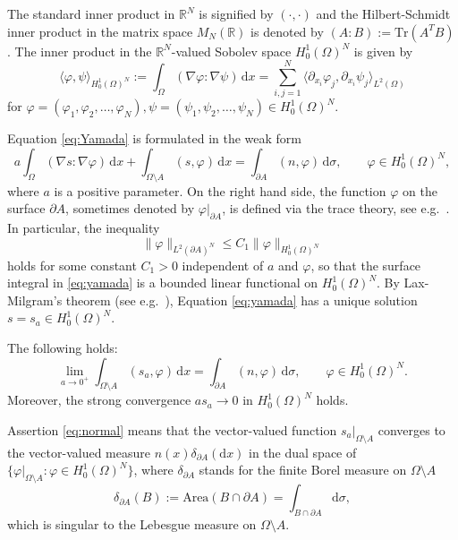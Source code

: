 \documentclass[graybox]{svmult}
\renewcommand{\d}{\mathrm{d}}  %
\newcommand{\R}{\mathbb{R}}  %
\renewcommand{\AA}{A}  %
\begin{document}
The standard inner product in $\R^N$ is signified by $(\cdot,\cdot)$ and the Hilbert-Schmidt inner product  in the matrix space $M_N(\R)$ is denoted by $(A: B):=\text{Tr}(A^{T}B)$. The inner product in the $\R^N$-valued Sobolev space $H_0^1(\Omega)^N$ is given by  
\[
\langle \varphi, \psi \rangle_{H_0^1(\Omega)^N} :=  \int_\Omega (\nabla \varphi: \nabla \psi)\, \d x= \sum_{i,j=1}^N  \langle \partial_{x_i}\varphi_j,  \partial_{x_i}\psi_j\rangle_{L^2(\Omega)}
\]
for $\varphi=(\varphi_1,\varphi_2,\dots, \varphi_N), \psi=(\psi_1,\psi_2,\dots, \psi_N) \in H_0^1(\Omega)^N$. 


Equation \eqref{eq:Yamada} is formulated in the weak form 
\begin{equation}\label{eq:yamada}
a \int_\Omega (\nabla s: \nabla \varphi)\, \d x  + \int_{\Omega\setminus \AA}(s,\varphi) \, \d x = \int_{\partial \AA} (n,\varphi) \,\d\sigma, \qquad \varphi \in H_0^1(\Omega)^N,  
\end{equation}
where $a$ is a positive parameter.  
On the right hand side, the function $\varphi$ on the surface $\partial \AA$, sometimes denoted by $\varphi|_{\partial\AA}$,  is defined via the trace theory, see e.g.\ \cite[Theorem 18.1]{Leo}.  
In particular, the inequality 
\begin{equation} \label{eq:Trace}
\|\varphi \|_{L^2(\partial \AA)^N} \le C_1 \|\varphi\|_{H_0^1(\Omega)^N}
\end{equation}
holds for some constant $C_1>0$ independent of $a$ and $\varphi$, so that the surface integral in \eqref{eq:yamada} is a bounded linear functional on $H_0^1(\Omega)^N$. By Lax-Milgram's theorem (see e.g.\ \cite[Corollary 5.8]{B11}), Equation \eqref{eq:yamada} has a unique solution $s=s_a\in H_0^1(\Omega)^N$. 

\begin{theorem} [\cite{M1}] \label{thm1}The following holds:  
	\begin{equation}\label{eq:normal}
	\lim_{a\to0^+} \int_{\Omega \setminus \AA}(s_a, \varphi)  \, \d x = \int_{\partial \AA} (n,\varphi) \, \d\sigma, \qquad  \varphi\in H_0^1(\Omega)^N. 
	\end{equation}
	Moreover, the strong convergence $a s_a \to 0$ in $H_0^1(\Omega)^N$   holds. 
\end{theorem}
\begin{remark}\label{rem1}
	Assertion \eqref{eq:normal} means that the vector-valued function $s_a |_{\Omega\setminus \AA}$ converges to the vector-valued measure $n(x)\delta_{\partial \AA}(\d x)$ in the dual space of $\{\varphi|_{\Omega \setminus \AA}: \varphi \in H_0^1(\Omega)^N \}$, where $\delta_{\partial \AA}$ stands for the finite Borel measure on $\Omega \setminus \AA$
	\begin{equation}\label{eq:delta}
	\delta_{\partial\AA}(B) := \text{Area}(B\cap \partial \AA) =  \int_{B\cap \partial \AA} \d \sigma, 
	\end{equation}
	which is singular to the Lebesgue measure on $\Omega \setminus \AA$.  
\end{remark}
\end{document}

